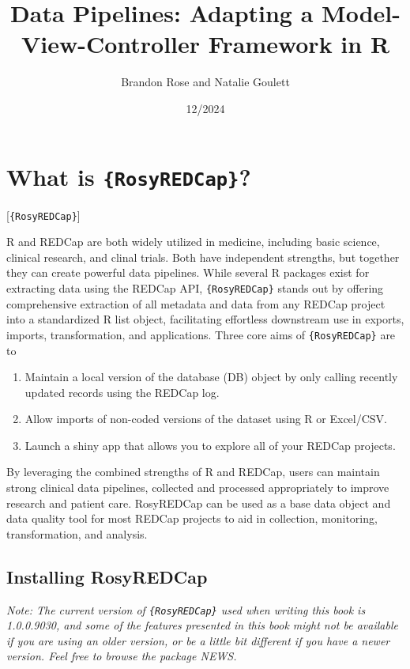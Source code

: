\documentclass[
]{book}
\title{Data Pipelines: Adapting a Model-View-Controller Framework in R}
\author{Brandon Rose and Natalie Goulett}
\date{12/2024}
\providecommand{\tightlist}{%
  \setlength{\itemsep}{0pt}\setlength{\parskip}{0pt}}
\begin{document}
\maketitle

{
\setcounter{tocdepth}{1}
\tableofcontents
}
\chapter{\texorpdfstring{What is \texttt{\{RosyREDCap\}}?}{What is \{RosyREDCap\}?}}\label{what-is-rosyredcap}

{[}\texttt{\{RosyREDCap\}}{]}

R and REDCap are both widely utilized in medicine, including basic science, clinical research, and clinal trials.
Both have independent strengths, but together they can create powerful data pipelines.
While several R packages exist for extracting data using the REDCap API, \texttt{\{RosyREDCap\}} stands out by offering comprehensive extraction of all metadata and data from any REDCap project into a standardized R list object, facilitating effortless downstream use in exports, imports, transformation, and applications.
Three core aims of \texttt{\{RosyREDCap\}} are to

\begin{enumerate}
\def\labelenumi{\arabic{enumi}.}
\tightlist
\item
  Maintain a local version of the database (DB) object by only calling recently updated records using the REDCap log.
\item
  Allow imports of non-coded versions of the dataset using R or Excel/CSV.
\item
  Launch a shiny app that allows you to explore all of your REDCap projects.
\end{enumerate}

By leveraging the combined strengths of R and REDCap, users can maintain strong clinical data pipelines, collected and processed appropriately to improve research and patient care.
RosyREDCap can be used as a base data object and data quality tool for most REDCap projects to aid in collection, monitoring, transformation, and analysis.

\section{Installing RosyREDCap}\label{installing-rosyredcap}

\emph{Note: The current version of \texttt{\{RosyREDCap\}} used when writing this book is 1.0.0.9030, and some of the features presented in this book might not be available if you are using an older version, or be a little bit different if you have a newer version. Feel free to browse the package NEWS.}
\end{document}
